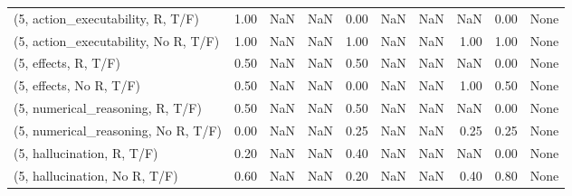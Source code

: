 \begin{table*}[h!]
\begin{adjustbox}{width=2\columnwidth,center}
\begin{tabular}{lrrr|rrr|rrr}
(5, action\_executability, R, T/F)    &                      1.00 &                   NaN &                       NaN &                          0.00 &                       NaN &                           NaN &                                    NaN &                               0.00 &                                  None \\
(5, action\_executability, No R, T/F) &                      1.00 &                   NaN &                       NaN &                          1.00 &                       NaN &                           NaN &                                   1.00 &                               1.00 &                                  None \\
(5, effects, R, T/F)                 &                      0.50 &                   NaN &                       NaN &                          0.50 &                       NaN &                           NaN &                                    NaN &                               0.00 &                                  None \\
(5, effects, No R, T/F)              &                      0.50 &                   NaN &                       NaN &                          0.00 &                       NaN &                           NaN &                                   1.00 &                               0.50 &                                  None \\
(5, numerical\_reasoning, R, T/F)     &                      0.50 &                   NaN &                       NaN &                          0.50 &                       NaN &                           NaN &                                    NaN &                               0.00 &                                  None \\
(5, numerical\_reasoning, No R, T/F)  &                      0.00 &                   NaN &                       NaN &                          0.25 &                       NaN &                           NaN &                                   0.25 &                               0.25 &                                  None \\
(5, hallucination, R, T/F)           &                      0.20 &                   NaN &                       NaN &                          0.40 &                       NaN &                           NaN &                                    NaN &                               0.00 &                                  None \\
(5, hallucination, No R, T/F)        &                      0.60 &                   NaN &                       NaN &                          0.20 &                       NaN &                           NaN &                                   0.40 &                               0.80 &                                  None \\

\end{tabular}
\end{adjustbox}
\end{table*}
